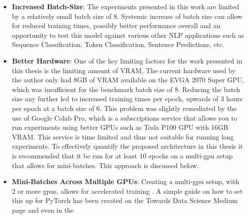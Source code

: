 \documentclass[a4paper,12pt]{report}
\begin{document}
    \begin{itemize}
    	
    	\item \textbf{Increased Batch-Size}: The experiments presented in this work are limited by a relatively small batch size of 8. Systemic increase of batch size can allow for reduced training times, possibly better performance overall and an opportunity to test this model against various other NLP applications such as Sequence Classification, Token Classification, Sentence Predictions, etc. 
    	\item \textbf{Better Hardware}: One of the key limiting factors for the work presented in this thesis is the limiting amount of VRAM, The current hardware used by the author only had 8GB of VRAM available on the EVGA 2070 Super GPU, which was insufficient for the benchmark batch size of 8. Reducing the batch size any further led to increased training times per epoch, upwards of 3 hours per epoch at a batch size of 6. This problem was slightly remediated by the use of Google Colab Pro, which is a subscriptions service that allows you to run experiments using better GPUs such as Tesla P100 GPU with 16GB VRAM. This service is time limited and thus not suitable for running long experiments. To effectively quantify the proposed architecture in this thesis it is recommended that it be run for at least 10 epochs on a multi-gpu setup that allows for mini-batches. This approach is discussed below.
    	\item \textbf{Mini-Batches Across Multiple GPUs}: Creating a multi-gpu setup, with 2 or more gpus, allows for accelerated training \citep{multigpu1}. A simple guide on how to set this up for PyTorch has been created on the Towards Data Science Medium page \citep{multigpu2} and even in the 
    \end{itemize}
\end{document}
